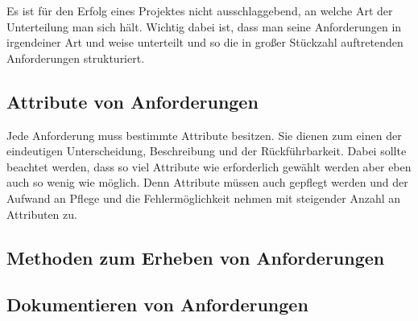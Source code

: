 Es ist für den Erfolg eines Projektes nicht ausschlaggebend, an welche Art der Unterteilung man sich hält.
Wichtig dabei ist, dass man seine Anforderungen in irgendeiner Art und weise unterteilt und so die in großer Stückzahl auftretenden Anforderungen strukturiert. 

\subsection{Attribute von Anforderungen}

Jede Anforderung muss bestimmte Attribute besitzen. Sie dienen zum einen der eindeutigen Unterscheidung, Beschreibung und der Rückführbarkeit. Dabei sollte beachtet werden, dass so viel Attribute wie erforderlich gewählt werden aber eben auch so wenig wie möglich. Denn Attribute müssen auch gepflegt werden und der Aufwand an Pflege und die Fehlermöglichkeit nehmen mit steigender Anzahl an Attributen zu.

\subsection{Methoden zum Erheben von Anforderungen}

\subsection{Dokumentieren von Anforderungen}



